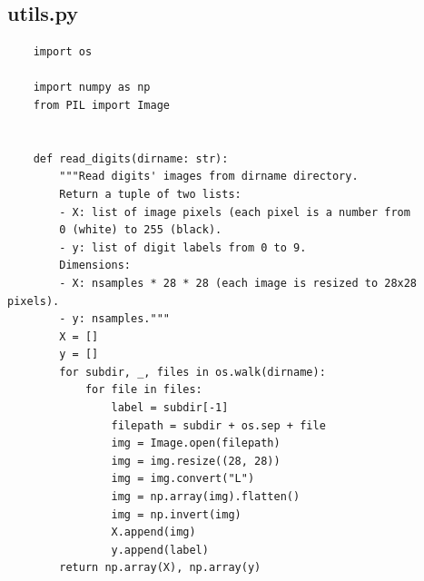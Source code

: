 \documentclass[12pt,a4paper]{article}
\begin{document}
\subsection{utils.py}
\begin{lstlisting}
	import os

	import numpy as np
	from PIL import Image
	
	
	def read_digits(dirname: str):
		"""Read digits' images from dirname directory.
		Return a tuple of two lists:
		- X: list of image pixels (each pixel is a number from
		0 (white) to 255 (black).
		- y: list of digit labels from 0 to 9.
		Dimensions:
		- X: nsamples * 28 * 28 (each image is resized to 28x28 pixels).
		- y: nsamples."""
		X = []
		y = []
		for subdir, _, files in os.walk(dirname):
			for file in files:
				label = subdir[-1]
				filepath = subdir + os.sep + file
				img = Image.open(filepath)
				img = img.resize((28, 28))
				img = img.convert("L")
				img = np.array(img).flatten()
				img = np.invert(img)
				X.append(img)
				y.append(label)
		return np.array(X), np.array(y)
\end{lstlisting}
\end{document}
